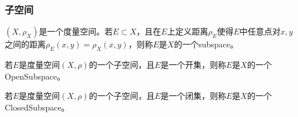 \subsubsection{子空间}
\begin{definition}
	$(X,\rho_X)$是一个度量空间。若$E\subset X$，且在$E$上定义距离$\rho_E$使得$E$中任意点对$x,y$之间的距离$\rho_E(x,y)=\rho_X(x,y)$，则称$E$是$X$的一个\gls{subspace}。
\end{definition}
\begin{definition}
	若$E$是度量空间$(X,\rho)$的一个子空间，且$E$是一个开集，则称$E$是$X$的一个\gls{OpenSubspace}。
\end{definition}
\begin{definition}
	若$E$是度量空间$(X,\rho)$的一个子空间，且$E$是一个闭集，则称$E$是$X$的一个\gls{ClosedSubspace}。
\end{definition}